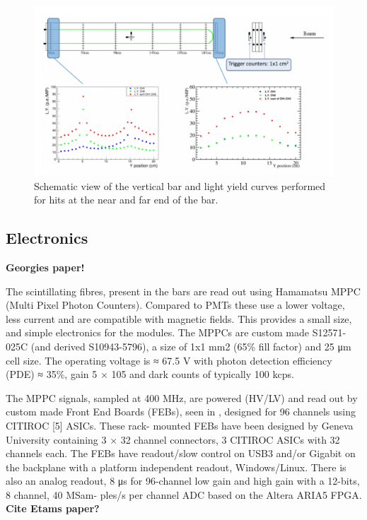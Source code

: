 \begin{figure}[h!]
\centering
\includegraphics[width=\textwidth]{figures/vertical.png}
\caption{Schematic view of the vertical bar and light yield curves performed for hits at the near and far end of the bar.}
\label{fig:vertical}
\end{figure}


\subsection{Electronics}
\textbf{Georgies paper!}

The scintillating fibres, present in the bars are read out using Hamamatsu MPPC (Multi Pixel Photon Counters). Compared to PMTs these use a lower voltage, less current and are compatible with magnetic fields. This provides a small size, and simple electronics for the modules. The MPPCs are custom made S12571-025C (and derived S10943-5796), a size of 1x1 mm2 (65\% fill factor) and 25 μm cell size. The operating voltage is ≈ 67.5 V with photon detection efficiency (PDE) ≈ 35\%, gain 5 × 105 and dark counts of typically 100 kcps.

The MPPC signals, sampled at 400 MHz, are powered (HV/LV) and read out by custom made Front End Boards (FEBs), seen in , designed for 96 channels using CITIROC [5] ASICs. These rack- mounted FEBs have been designed by Geneva University containing 3 × 32 channel connectors, 3 CITIROC ASICs with 32 channels each. The FEBs have readout/slow control on USB3 and/or Gigabit on the backplane with a platform independent readout, Windows/Linux. There is also an analog readout, 8 μs for 96-channel low gain and high gain with a 12-bits, 8 channel, 40 MSam- ples/s per channel ADC based on the Altera ARIA5 FPGA. \textbf{Cite Etams paper?}

